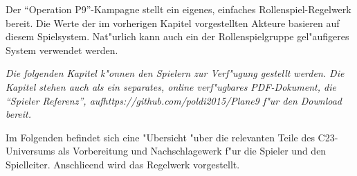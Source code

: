 
Der ``Operation P9''-Kampagne stellt ein eigenes, einfaches Rollenspiel-Regelwerk bereit. Die Werte der im vorherigen Kapitel vorgestellten Akteure basieren auf diesem Spielsystem. Nat"urlich kann auch ein der Rollenspielgruppe gel"aufigeres System verwendet werden.

\emph{Die folgenden Kapitel k"onnen den Spielern zur Verf"ugung gestellt werden. Die Kapitel stehen auch als ein separates, online verf"ugbares PDF-Dokument, die ``Spieler Referenz'', auf\newline{}\textit{https://github.com/poldi2015/Plane9} f"ur den Download bereit.}

Im Folgenden befindet sich eine "Ubersicht "uber die relevanten Teile des C23-Universums als Vorbereitung und Nachschlagewerk f"ur die Spieler und den Spielleiter. Anschlie\3end wird das Regelwerk vorgestellt.





